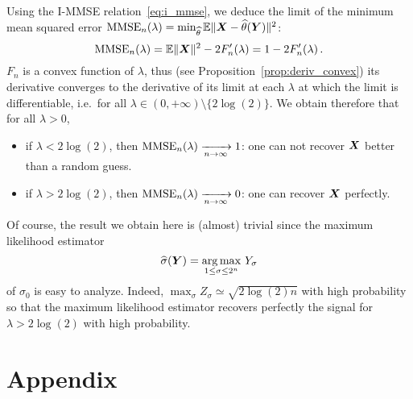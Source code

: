 \documentclass[12pt,nocut]{article}
\begin{document}
Using the I-MMSE relation~\eqref{eq:i_mmse}, we deduce the limit of the minimum mean squared error ${{\rm MMSE}}_n(\lambda) =  \min_{\widehat{\theta}} \mathbb{E} \| {\boldsymbol X} - \widehat{\theta}({\boldsymbol Y}) \|^2$:
$$
{{\rm MMSE}}_n(\lambda) = \mathbb{E} \|{\boldsymbol X}\|^2 - 2 F_n'(\lambda) = 1 - 2 F_n'(\lambda) \,.
$$
$F_n$ is a convex function of $\lambda$, thus (see Proposition~\ref{prop:deriv_convex}) its derivative converges to the derivative of its limit at each $\lambda$ at which the limit is differentiable, i.e.\ for all $\lambda \in (0,+\infty) \setminus \{2 \log(2) \}$. We obtain therefore that for all $\lambda >0$,
\begin{itemize}
	\item if $\lambda < 2 \log(2)$, then ${{\rm MMSE}}_n(\lambda) \xrightarrow[n \to \infty]{} 1$: one can not recover ${\boldsymbol X}$ better than a random guess.
	\item if $\lambda > 2 \log(2)$, then ${{\rm MMSE}}_n(\lambda) \xrightarrow[n \to \infty]{} 0$: one can recover ${\boldsymbol X}$ perfectly.
\end{itemize}
Of course, the result we obtain here is (almost) trivial since the maximum likelihood estimator 
$$
\widehat{\sigma}({\boldsymbol Y}) = \operatorname*{arg\,max}_{1 \leq \sigma \leq 2^n} \, Y_{\sigma}
$$
of $\sigma_0$ is easy to analyze. Indeed, $\max_{\sigma} Z_{\sigma} \simeq \sqrt{2 \log(2)n}$ with high probability so that the maximum likelihood estimator recovers perfectly the signal for $\lambda > 2 \log(2)$ with high probability.


\section{Appendix}
\end{document}
